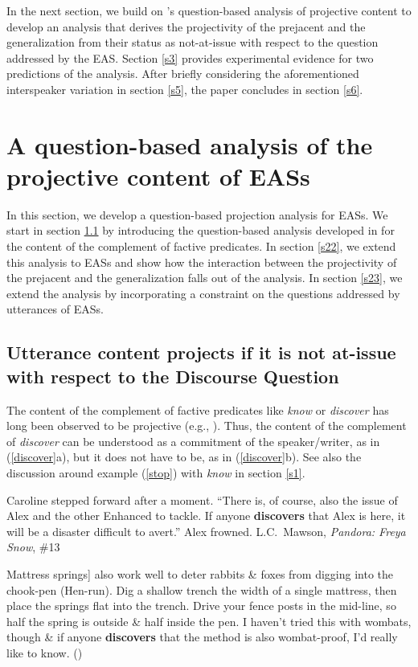 \documentclass[11pt,fleqn]{article}
\newcommand{\6}{\mbox{$[\hspace*{-.6mm}[$}}
\newcommand{\9}{\mbox{$]\hspace*{-.6mm}]$}}
\newcommand{\citepos}[1]{\citeauthor{#1}'s \citeyear{#1}}
\begin{document}
In the next section, we build on \citepos{best-question} question-based analysis of projective content to develop an analysis that derives the projectivity of the prejacent and the generalization from their status as not-at-issue with respect to the question addressed by the EAS. Section \ref{s3} provides experimental evidence for two predictions of the analysis. After briefly considering the aforementioned interspeaker variation in section \ref{s5}, the paper concludes in section \ref{s6}.

\section{A question-based analysis of the projective content of EASs}\label{s2}

In this section, we develop a question-based projection analysis for EASs. We start in section \ref{s21} by introducing the question-based analysis developed in \citealt{best-question} for the content of the complement of factive predicates. In section \ref{s22}, we extend this analysis to EASs and show how the  interaction between the projectivity of the prejacent and the generalization falls out of the analysis. In section \ref{s23}, we extend the analysis by incorporating a constraint on the questions addressed by utterances of EASs.

\subsection{Utterance content projects if it is not at-issue with respect to the Discourse Question}\label{s21}

The content of the complement of factive predicates like {\em know} or {\em discover} has long been observed to be projective (e.g., \citealt{kiparsky-kiparsky70,karttunen71b}). Thus, the content of the complement of {\em discover} can be understood as a commitment of the speaker/writer, as  in (\ref{discover}a), but it does not have to be, as in (\ref{discover}b). See also the discussion around example (\ref{stop}) with {\em know} in section \ref{s1}.

\begin{exe}
\ex\label{discover}
\begin{xlist}
\ex Caroline stepped forward after a moment. ``There is, of course, also the issue of Alex and the other Enhanced to tackle. If anyone {\bf discovers} that Alex is here, it will be a disaster difficult to avert.'' Alex frowned. \hfill L.C.\ Mawson, {\em Pandora: Freya Snow}, \#13

\ex {[}Mattress springs] also work well to deter rabbits \& foxes from digging into the chook-pen (Hen-run). Dig a shallow trench the width of a single mattress, then place the springs flat into the trench. Drive your fence posts in the mid-line, so half the spring is outside \& half inside the pen. I haven't tried this with wombats, though \& if anyone {\bf discovers} that the method is also wombat-proof, I'd really like to know. \hfill (\citealt[79]{beaver-belly})

\end{xlist}
\end{exe}
\end{document}
